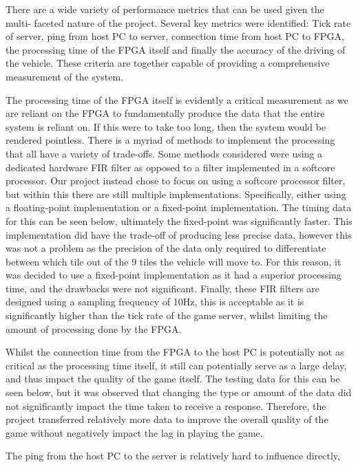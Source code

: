 \documentclass[12pt,a4paper]{article}
\begin{document}
There are a wide variety of performance metrics that can be used given the multi-
faceted nature of the project. Several key metrics were identified: Tick rate of 
server, ping from host PC to server, connection time from host PC to FPGA, the 
processing time of the FPGA itself and finally the accuracy of the driving of 
the vehicle. These criteria are together capable of providing a comprehensive 
measurement of the system. 
\par
The processing time of the FPGA itself is evidently a critical measurement as we 
are reliant on the FPGA to fundamentally produce the data that the entire system 
is reliant on. If this were to take too long, then the system would be rendered 
pointless. There is a myriad of methods to implement the processing that all have 
a variety of trade-offs. Some methods considered were using a dedicated hardware 
FIR filter as opposed to a filter implemented in a softcore processor. Our project 
instead chose to focus on using a softcore processor filter, but within this there 
are still multiple implementations. Specifically, either using a floating-point 
implementation or a fixed-point implementation. The timing data for this can be 
seen below, ultimately the fixed-point was significantly faster. This implementation
 did have the trade-off of producing less precise data, however this was not a 
 problem as the precision of the data only required to differentiate between which 
 tile out of the 9 tiles the vehicle will move to. For this reason, it was decided 
 to use a fixed-point implementation as it had a superior processing time, and the 
 drawbacks were not significant. Finally, these FIR filters are designed using a 
 sampling frequency of 10Hz, this is acceptable as it is significantly higher than 
 the tick rate of the game server, whilst limiting the amount of processing done by 
 the FPGA.
 \par
 Whilst the connection time from the FPGA to the host PC is potentially not as 
 critical as the processing time itself, it still can potentially serve as a 
 large delay, and thus impact the quality of the game itself. The testing data 
 for this can be seen below, but it was observed that changing the type or amount 
 of the data did not significantly impact the time taken to receive a response. 
 Therefore, the project transferred relatively more data to improve the overall 
 quality of the game without negatively impact the lag in playing the game. 
 \par
 The ping from the host PC to the server is relatively hard to influence directly, 
\end{document}
